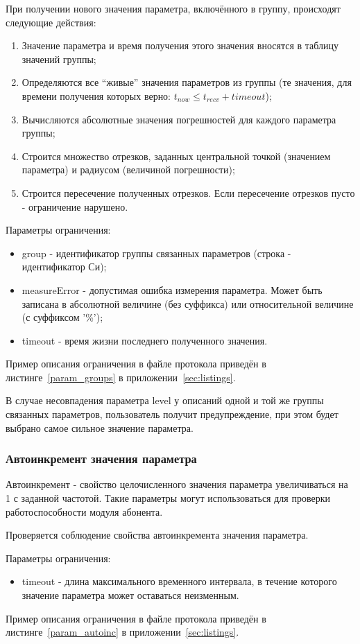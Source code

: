 При получении нового значения параметра, включённого в группу, происходят 
следующие действия:

\begin{enumerate}
 \item Значение параметра и время получения этого значения вносятся в таблицу 
значений группы;
 \item Определяются все ``живые'' значения параметров из группы (те значения, 
для времени 
получения которых верно: $t_{now} \leq t_{recv} + timeout$);
 \item Вычисляются абсолютные значения погрешностей для каждого параметра 
группы;
 \item Строится множество отрезков, заданных центральной точкой (значением 
параметра) и радиусом (величиной погрешности);
 \item Строится пересечение полученных отрезков. Если пересечение отрезков 
пусто - ограничение нарушено.
\end{enumerate}

Параметры ограничения:
\begin{itemize}
 \item group - идентификатор группы связанных параметров (строка - 
идентификатор Си);
 \item measureError - допустимая ошибка измерения параметра. Может быть 
записана в абсолютной величине (без суффикса) или относительной величине (с 
суффиксом '\%');
 \item timeout - время жизни последнего полученного значения.
\end{itemize}

Пример описания ограничения в файле протокола приведён в 
листинге~\ref{param_groups} в приложении~\ref{sec:listings}.

В случае несовпадения параметра level у описаний одной и той же 
группы связанных параметров, пользователь получит предупреждение, при этом 
будет выбрано самое сильное значение параметра.

\subsubsection{Автоинкремент значения параметра}

Автоинкремент - свойство целочисленного значения параметра 
увеличиваться на 1 с заданной частотой. Такие параметры могут 
использоваться для проверки работоспособности модуля абонента.

Проверяется соблюдение свойства автоинкремента значения параметра.

Параметры ограничения:
\begin{itemize}
 \item timeout - длина максимального временного интервала, в течение которого 
значение параметра может оставаться неизменным.
\end{itemize}

Пример описания ограничения в файле протокола приведён в 
листинге~\ref{param_autoinc} в приложении~\ref{sec:listings}.